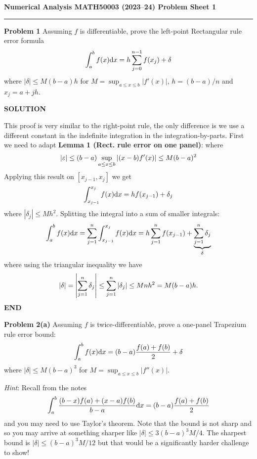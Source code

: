 \documentclass[12pt,a4paper]{article}
\def\endash{–}
\begin{document}
\textbf{Numerical Analysis MATH50003 (2023\ensuremath{\endash}24) Problem Sheet 1}

\rule{\textwidth}{1pt}
\textbf{Problem 1} Assuming $f$ is differentiable, prove the left-point Rectangular rule error formula
\[
\ensuremath{\int}_a^b f(x) {\rm d}x =  h \ensuremath{\sum}_{j=0}^{n-1} f(x_j) +  \ensuremath{\delta}
\]
where $|\ensuremath{\delta}| \ensuremath{\leq} M (b-a) h$ for $M = \sup_{a \ensuremath{\leq} x \ensuremath{\leq} b}|f'(x)|$, $h = (b-a)/n$ and $x_j = a + jh$.

\textbf{SOLUTION}

This proof is very similar to the right-point rule, the only difference is we use a different constant in the indefinite integration in the integration-by-parts. First we need to adapt \textbf{Lemma 1 (Rect. rule error on one panel)}:
where
\[
\left|{\varepsilon}\right| \leq (b-a) \sup_{a \leq x \leq b}|(x-b) f'(x)| \leq M (b-a)^2
\]
Applying this result on $[x_{j-1},x_j]$ we get
\[
\ensuremath{\int}_{x_{j-1}}^{x_j} f(x) {\rm d}x = h f(x_{j-1}) + \ensuremath{\delta}_j
\]
where $|\ensuremath{\delta}_j| \ensuremath{\leq} M h^2$. Splitting the integral into a sum of smaller integrals:
\[
\ensuremath{\int}_a^b f(x) {\rm d}x = \ensuremath{\sum}_{j=1}^n  \ensuremath{\int}_{x_{j-1}}^{x_j} f(x) {\rm d}x =
h \ensuremath{\sum}_{j=1}^n f(x_{j-1}) +  \underbrace{\ensuremath{\sum}_{j=1}^n \ensuremath{\delta}_j}_\ensuremath{\delta}
\]
where using the triangular inequality we have
\[
|\delta| = \left|{ \sum_{j=1}^n \delta_j}\right| \leq \sum_{j=1}^n |\delta_j| \leq M n h^2 = M(b-a)h.
\]
\textbf{END}

\textbf{Problem 2(a)}  Assuming $f$ is twice-differentiable, prove a one-panel Trapezium rule error bound:
\[
\ensuremath{\int}_a^b f(x) {\rm d}x = (b-a) {f(a) + f(b) \over 2} +  \ensuremath{\delta}
\]
where $|\ensuremath{\delta}| \ensuremath{\leq} M (b-a)^3$ for $M = \sup_{a \ensuremath{\leq} x \ensuremath{\leq} b}|f''(x)|$.

\emph{Hint}: Recall from the notes
\[
\int_a^b {(b-x) f(a) + (x-a) f(b) \over b-a} {\rm d} x = (b-a) {f(a) + f(b) \over 2}
\]
and you may need to use Taylor's theorem. Note that the bound is not sharp and so you may arrive at something sharper like $|\ensuremath{\delta}| \ensuremath{\leq} 3(b-a)^3 M/4$. The sharpest bound is $|\ensuremath{\delta}| \ensuremath{\leq} (b-a)^3 M/12$ but that would be a significantly harder challenge to show!
\end{document}
